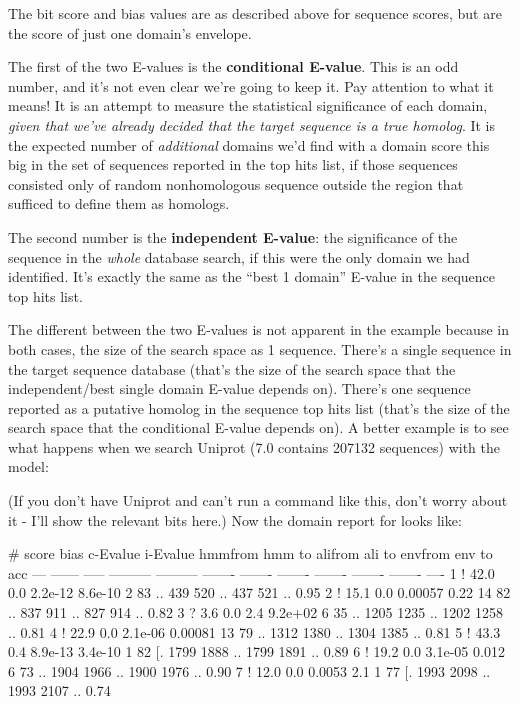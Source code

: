 The bit score and bias values are as described above for sequence
scores, but are the score of just one domain's envelope. 

The first of the two E-values is the \textbf{conditional
E-value}. This is an odd number, and it's not even clear we're going
to keep it. Pay attention to what it means! It is an attempt to
measure the statistical significance of each domain, \emph{given that
we've already decided that the target sequence is a true homolog}.  It
is the expected number of \emph{additional} domains we'd find with a
domain score this big in the set of sequences reported in the top hits
list, if those sequences consisted only of random nonhomologous
sequence outside the region that sufficed to define them as homologs. 

The second number is the \textbf{independent E-value}: the
significance of the sequence in the \emph{whole} database search, if
this were the only domain we had identified. It's exactly the same as
the ``best 1 domain'' E-value in the sequence top hits list.

The different between the two E-values is not apparent in the
 example because in both cases, the size of the
search space as 1 sequence. There's a single sequence in the target
sequence database (that's the size of the search space that the
independent/best single domain E-value depends on). There's one
sequence reported as a putative homolog in the sequence top hits list
(that's the size of the search space that the conditional E-value
depends on). A better example is to see what happens when we search
Uniprot (7.0 contains 207132 sequences) with the  model:


(If you don't have Uniprot and can't run a command like this, don't
worry about it - I'll show the relevant bits here.) Now the domain
report for  looks like:

\begin{sreoutput}
   #    score  bias  c-Evalue  i-Evalue hmmfrom  hmm to    alifrom  ali to    envfrom  env to     acc
 ---   ------ ----- --------- --------- ------- -------    ------- -------    ------- -------    ----
   1 !   42.0   0.0   2.2e-12   8.6e-10       2      83 ..     439     520 ..     437     521 .. 0.95
   2 !   15.1   0.0   0.00057      0.22      14      82 ..     837     911 ..     827     914 .. 0.82
   3 ?    3.6   0.0       2.4   9.2e+02       6      35 ..    1205    1235 ..    1202    1258 .. 0.81
   4 !   22.9   0.0   2.1e-06   0.00081      13      79 ..    1312    1380 ..    1304    1385 .. 0.81
   5 !   43.3   0.4   8.9e-13   3.4e-10       1      82 [.    1799    1888 ..    1799    1891 .. 0.89
   6 !   19.2   0.0   3.1e-05     0.012       6      73 ..    1904    1966 ..    1900    1976 .. 0.90
   7 !   12.0   0.0    0.0053       2.1       1      77 [.    1993    2098 ..    1993    2107 .. 0.74
\end{sreoutput}

